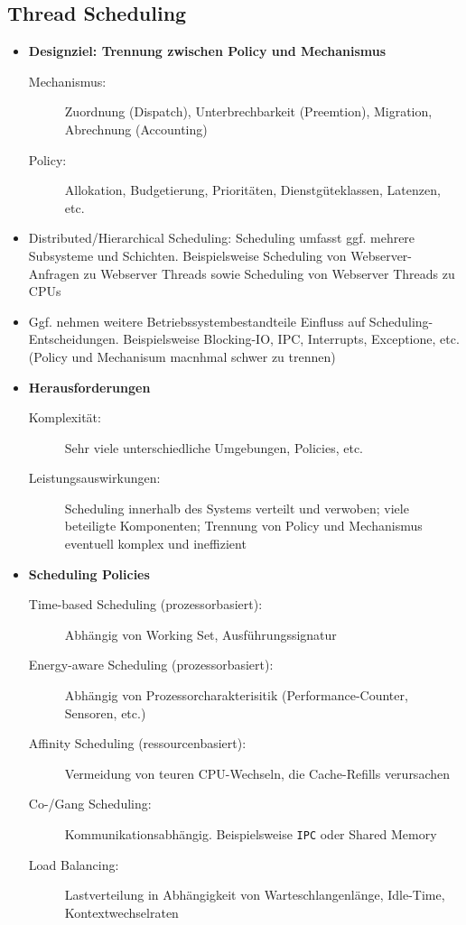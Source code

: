 \subsection{Thread Scheduling}
\begin{itemize}
	\item \textbf{Designziel: Trennung zwischen Policy und Mechanismus}
	\begin{description}
		\item[Mechanismus:] Zuordnung (Dispatch), Unterbrechbarkeit (Preemtion), Migration, Abrechnung (Accounting)
		\item[Policy:] Allokation, Budgetierung, Prioritäten, Dienstgüteklassen, Latenzen, etc.
	\end{description}
	\item Distributed/Hierarchical Scheduling: Scheduling umfasst ggf. mehrere Subsysteme und Schichten. Beispielsweise Scheduling von Webserver-Anfragen zu Webserver Threads sowie Scheduling von Webserver Threads zu CPUs
	\item Ggf. nehmen weitere Betriebssystembestandteile Einfluss auf Scheduling-Entscheidungen. Beispielsweise Blocking-IO, IPC, Interrupts, Exceptione, etc. (Policy und Mechanisum macnhmal schwer zu trennen)
	\item \textbf{Herausforderungen}
	\begin{description}
		\item[Komplexität:] Sehr viele unterschiedliche Umgebungen, Policies, etc.
		\item[Leistungsauswirkungen:] Scheduling innerhalb des Systems verteilt und verwoben; viele beteiligte Komponenten; Trennung von Policy und Mechanismus eventuell komplex und ineffizient
	\end{description}
	\item \textbf{Scheduling Policies}
	\begin{description}
		\item[Time-based Scheduling (prozessorbasiert):] Abhängig von Working Set, Ausführungssignatur
		\item[Energy-aware Scheduling (prozessorbasiert):] Abhängig von Prozessorcharakterisitik (Performance-Counter, Sensoren, etc.)
		\item[Affinity Scheduling (ressourcenbasiert):] Vermeidung von teuren CPU-Wechseln, die Cache-Refills verursachen
		\item[Co-/Gang Scheduling:] Kommunikationsabhängig. Beispielsweise \texttt{IPC} oder Shared Memory
		\item[Load Balancing:] Lastverteilung in Abhängigkeit von Warteschlangenlänge, Idle-Time, Kontextwechselraten

\end{description}
\end{itemize}
